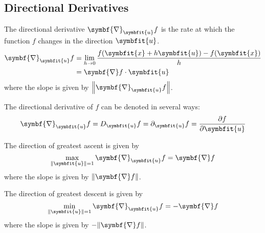 \documentclass{article}
\begin{document}
\subsection{Directional Derivatives}
\begin{definition}
    The directional derivative \(\symbf{\nabla}_{\symbfit{u}}f\) is the rate at
    which the function \(f\) changes in the direction \(\symbfit{u}\).
    \begin{align*}
        \symbf{\nabla}_{\symbfit{u}}f & = \lim_{h \to 0} \frac{f(\symbfit{x} + h\symbfit{u}) - f(\symbfit{x})}{h} \\
                                      & = \symbf{\nabla}f \cdot \symbfit{u}
    \end{align*}
    where the slope is given by \(\norm{\symbf{\nabla}_{\symbfit{u}}f}\).
\end{definition}
\begin{remark}
    The directional derivative of \(f\) can be denoted in several ways:
    \begin{equation*}
        \symbf{\nabla}_{\symbfit{u}}f = D_{\symbfit{u}} f = \partial_{\symbfit{u}} f = \pdv{f}{\symbfit{u}}
    \end{equation*}
\end{remark}
\begin{theorem}
    The direction of greatest ascent is given by
    \begin{equation*}
        \max_{\norm{\symbfit{u}} = 1} \symbf{\nabla}_{\symbfit{u}}f = \symbf{\nabla}f
    \end{equation*}
    where the slope is given by \(\norm{\symbf{\nabla}f}\).
\end{theorem}
\begin{theorem}
    The direction of greatest descent is given by
    \begin{equation*}
        \min_{\norm{\symbfit{u}} = 1} \symbf{\nabla}_{\symbfit{u}}f = -\symbf{\nabla}f
    \end{equation*}
    where the slope is given by \(-\norm{\symbf{\nabla}f}\).
\end{theorem}
\end{document}
